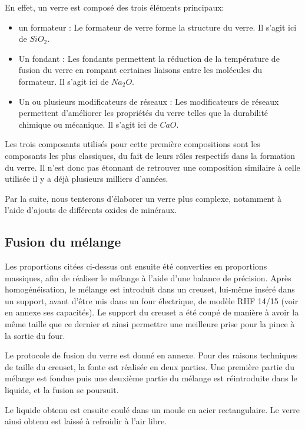 \documentclass{article}
\begin{document}
En effet, un verre est composé des trois éléments principaux:

\begin{itemize}
    \item un formateur : Le formateur de verre forme la structure du verre. Il s'agit ici de $SiO_2$.
    \item Un fondant : Les fondants permettent la réduction de la température de fusion du verre en rompant certaines liaisons entre les molécules du formateur. Il s'agit ici de $Na_2O$.
    \item Un ou plusieurs modificateurs de réseaux : Les modificateurs de réseaux permettent d'améliorer les propriétés du verre telles que la durabilité chimique ou mécanique. Il s'agit ici de $CaO$.
\end{itemize}

Les trois composants utilisés pour cette première compositions sont les composants les plus classiques, du fait de leurs rôles respectifs dans la formation du verre. Il n'est donc pas étonnant de retrouver une composition similaire à celle utilisée il y a déjà plusieurs milliers d'années. 

Par la suite, nous tenterons d'élaborer un verre plus complexe, notamment à l'aide d'ajouts de différents oxides de minéraux.

\subsection{Fusion du mélange}

Les proportions citées ci-dessus ont ensuite été converties en proportions massiques, afin de réaliser le mélange à l'aide d'une balance de précision. Après homogénéisation, le mélange est introduit dans un creuset, lui-même inséré dans un support, avant d'être mis dans un four électrique, de modèle RHF 14/15 (voir en annexe ses capacités). Le support du creuset a été coupé de manière à avoir la même taille que ce dernier et ainsi permettre une meilleure prise pour la pince à la sortie du four.

Le protocole de fusion du verre est donné en annexe. Pour des raisons techniques de taille du creuset, la fonte est réalisée en deux parties. Une première partie du mélange est fondue puis une deuxième partie du mélange est réintroduite dans le liquide, et la fusion se poursuit.

Le liquide obtenu est ensuite coulé dans un moule en acier rectangulaire. Le verre ainsi obtenu est laissé à refroidir à l'air libre.
\end{document}
